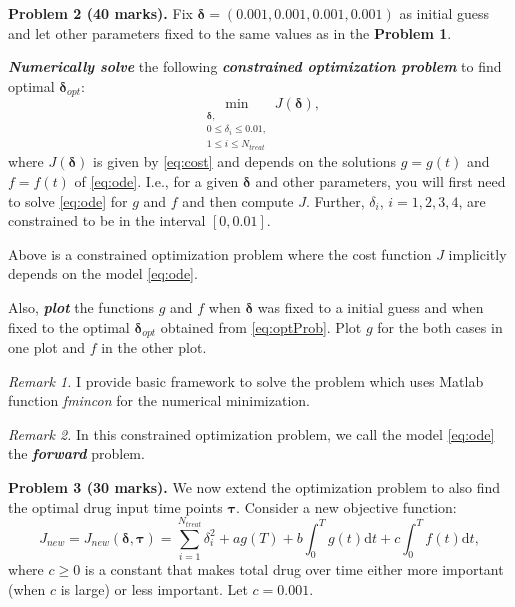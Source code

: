 \documentclass[11pt,a4paper]{article}
\newcommand{\dd}{\mathrm{d}}
\newcommand{\bolds}[1]{\boldsymbol{#1}}
\newcommand{\bfit}[1]{\textit{\textbf{#1}}}
\begin{document}
 
\vspace{10pt}
\noindent\textbf{Problem 2 (40 marks).} Fix $\bolds{\delta}  = (0.001, 0.001, 0.001, 0.001)$ as initial guess and let other parameters fixed to the same values as in the \textbf{Problem 1}. 

 \bfit{Numerically solve} the following \bfit{constrained optimization problem} to find optimal $\bolds{\delta}_{opt}$:
\begin{equation}\label{eq:optProb}
\min_{\substack{\bolds{\delta},\\
0 \leq \delta_i \leq 0.01, \\
1\leq i \leq N_{treat}}} J(\bolds{\delta}) ,
\end{equation}
where $J(\bolds{\delta})$ is given by \eqref{eq:cost} and depends on the solutions $g = g(t)$ and $f = f(t)$ of \eqref{eq:ode}. I.e., for a given $\bolds{\delta}$ and other parameters, you will first need to solve \eqref{eq:ode} for $g$ and $f$ and then compute $J$. Further, $\delta_i$, $i=1,2,3,4$, are constrained to be in the interval $[0, 0.01]$. 

Above is a constrained optimization problem where the cost function $J$ implicitly depends on the model \eqref{eq:ode}. 

Also, \bfit{plot} the functions $g$ and $f$ when $\bolds{\delta}$ was fixed to a initial guess and when fixed to the optimal $\bolds{\delta}_{opt}$ obtained from \eqref{eq:optProb}. Plot $g$ for the both cases in one plot and $f$  in the other plot. 

\vspace{10pt}
\noindent\textit{Remark 1.} I provide basic framework to solve the problem which uses Matlab function {\it fmincon} for the numerical minimization.

\vspace{10pt}
\noindent\textit{Remark 2.} In this constrained optimization problem, we call the model \eqref{eq:ode} the \bfit{forward} problem. 

\vspace{10pt}
\noindent\textbf{Problem 3 (30 marks).} We now extend the optimization problem to also find the optimal drug input time points $\bolds{\tau}$. Consider a new objective function:
\begin{equation}
J_{new} = J_{new}(\bolds{\delta}, \bolds{\tau}) = \sum_{i=1}^{N_{treat}} \delta_i^2 + a g(T) + b \int_0^T g(t) \dd t + c\int_0^T f(t) \dd t,
\end{equation}
where $c\geq 0$ is a constant that makes total drug over time either more important (when $c$ is large) or less important. Let $c = 0.001$.
\end{document}
